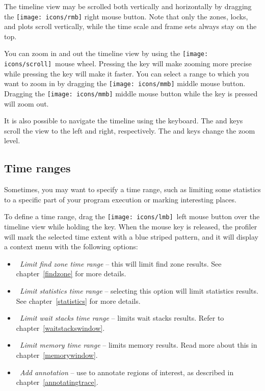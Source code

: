 \documentclass[hidelinks,titlepage,a4paper,twoside]{article}
\newcommand{\LMB}{\texttt{[image: icons/lmb]}}
\newcommand{\RMB}{\texttt{[image: icons/rmb]}}
\newcommand{\MMB}{\texttt{[image: icons/mmb]}}
\newcommand{\Scroll}{\texttt{[image: icons/scroll]}}
\begin{document}
The timeline view may be scrolled both vertically and horizontally by dragging the \RMB{} right mouse button. Note that only the zones, locks, and plots scroll vertically, while the time scale and frame sets always stay on the top.

You can zoom in and out the timeline view by using the \Scroll{}~mouse wheel. Pressing the \keys{\ctrl} key will make zooming more precise while pressing the \keys{\shift} key will make it faster. You can select a range to which you want to zoom in by dragging the \MMB{} middle mouse button. Dragging the \MMB{} middle mouse button while the \keys{\ctrl} key is pressed will zoom out.

It is also possible to navigate the timeline using the keyboard. The  and  keys scroll the view to the left and right, respectively. The  and  keys change the zoom level.

\subsection{Time ranges}
\label{timeranges}

Sometimes, you may want to specify a time range, such as limiting some statistics to a specific part of your program execution or marking interesting places.

To define a time range, drag the \LMB{}~left mouse button over the timeline view while holding the \keys{\ctrl} key. When the mouse key is released, the profiler will mark the selected time extent with a blue striped pattern, and it will display a context menu with the following options:

\begin{itemize}
\item \emph{\faSearch{}~Limit find zone time range} -- this will limit find zone results. See chapter~\ref{findzone} for more details.
\item \emph{\faSortAmountUp{}~Limit statistics time range} -- selecting this option will limit statistics results. See chapter~\ref{statistics} for more details.
\item \emph{\faHourglassHalf{}~Limit wait stacks time range} -- limits wait stacks results. Refer to chapter~\ref{waitstackswindow}.
\item \emph{\faMemory{}~Limit memory time range} -- limits memory results. Read more about this in chapter~\ref{memorywindow}.
\item \emph{\faStickyNote{}~Add annotation} -- use to annotate regions of interest, as described in chapter~\ref{annotatingtrace}.
\end{itemize}
\end{document}
